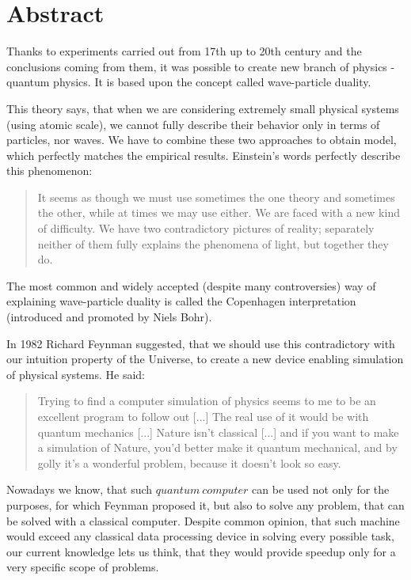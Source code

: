 \chapter{Abstract}
\thispagestyle{chapterBeginStyle}

Thanks to experiments carried out from 17th up to 20th century and the conclusions coming from them, it was possible to create new branch of physics - quantum physics. It is based upon the concept called wave-particle duality. 

This theory says, that when we are considering extremely small physical systems (using atomic scale), we cannot fully describe their behavior only in terms of particles, nor waves. We have to combine these two approaches to obtain model, which perfectly matches the empirical results. Einstein's words perfectly describe this phenomenon:

\begin{quote}
It seems as though we must use sometimes the one theory and sometimes the other, while at 
times we may use either. We are faced with a new kind of difficulty. We have two 
contradictory pictures of reality; separately neither of them fully explains the phenomena of 
light, but together they do.
\end{quote}

The most common and widely accepted (despite many controversies) way of explaining wave-particle duality is called the Copenhagen interpretation (introduced and promoted by Niels Bohr).

In 1982 Richard Feynman suggested, that we should use this contradictory with our intuition property of the Universe, to create a new device enabling simulation of physical systems. He said:

\begin{quote}
Trying to find a computer simulation of physics seems to me to be an 
excellent program to follow out [...] The real use of it would be with quantum 
mechanics [...] Nature isn’t classical [...] and if you want to make a simulation of Nature, you’d better make it quantum mechanical, and by golly it’s a wonderful problem, because it doesn’t look so easy.
\end{quote}

Nowadays we know, that such $quantum\ computer$ can be used not only for the purposes, for which Feynman proposed it, but also to solve any problem, that can be solved with a classical computer. Despite common opinion, that such machine would exceed any classical data processing device in solving every possible task, our current knowledge lets us think, that they would provide speedup only for a very specific scope of problems.

